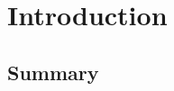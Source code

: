 \documentclass[a4paper]{article}
\begin{document}
\section{Introduction}









\subsection{Summary}
\end{document}
